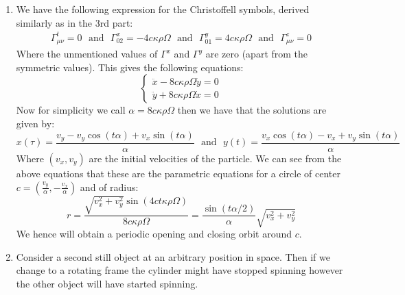 \documentclass[10pt,a4paper]{article}
\begin{document}
\begin{enumerate}
\begin{enumerate}
\item We have the following expression for the Christoffell symbols, derived similarly as in the 3rd part:
\begin{align*}
\Gamma^t_{\mu \nu} = 0 \mbox{~~and~~} \Gamma^x_{0 2} = -4 c \kappa \rho \Omega  \mbox{~~and~~} \Gamma^y_{0 1} = 4 c \kappa \rho \Omega \mbox{~~and~~} \Gamma^z_{\mu \nu} = 0
\end{align*}
Where the unmentioned values of $\Gamma^x$ and $\Gamma^y$ are zero (apart from the symmetric values). This gives the following equations:
\[
\begin{cases}
\ddot{x} - 8 c \kappa \rho \Omega \dot{y} = 0\\
\ddot{y} + 8 c \kappa \rho \Omega \dot{x} = 0
\end{cases}
\]
Now for simplicity we call $\alpha = 8 c \kappa \rho \Omega$ then we have that the solutions are given by:
\[
x(\tau) = \frac{v_y - v_y  \cos(t\alpha) + v_x \sin(t\alpha)}{\alpha} \mbox{~~and~~} y(t) = \frac{v_x \cos(t\alpha) - v_x + v_y \sin(t \alpha)}{\alpha}
\]
Where $(v_x, v_y)$ are the initial velocities of the particle. We can see from the above equations that these are the parametric equations for a circle of center $c = (\frac{v_y}{\alpha}, -\frac{v_x}{\alpha})$ and of radius:
\[
r = \frac{\sqrt{v_x^2 + v_y^2} \sin(4 c t \kappa \rho \Omega)}{8 c \kappa \rho \Omega} = \frac{\sin(t \alpha/2)}{\alpha} \sqrt{v_x^2 + v_y^2}
\]
We hence will obtain a periodic opening and closing orbit around $c$. 

\item Consider a second still object at an arbitrary position in space. Then if we change to a rotating frame the cylinder might have stopped spinning however the other object will have started spinning. 

\end{enumerate}

\end{enumerate}
\end{document}
